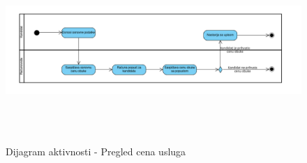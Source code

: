 \begin{figure}[H]
  \begin{center}
      \includegraphics[width=140mm, height=70mm]{Diagrams/dijagram_aktivnosti_cena_obuke.png}
  \end{center}
  \caption {Dijagram aktivnosti - Pregled cena usluga}
  \label{activity_pregled_cena_usluga}

\end{figure}

